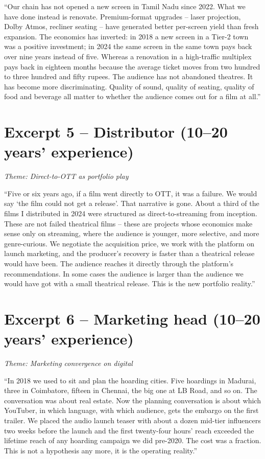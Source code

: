 ``Our chain has not opened a new screen in Tamil Nadu since 2022.
What we have done instead is renovate.  Premium-format upgrades --
laser projection, Dolby Atmos, recliner seating -- have generated
better per-screen yield than fresh expansion.  The economics has
inverted: in 2018 a new screen in a Tier-2 town was a positive
investment; in 2024 the same screen in the same town pays back over
nine years instead of five.  Whereas a renovation in a high-traffic
multiplex pays back in eighteen months because the average ticket
moves from two hundred to three hundred and fifty rupees.  The
audience has not abandoned theatres.  It has become more
discriminating.  Quality of sound, quality of seating, quality of
food and beverage all matter to whether the audience comes out for
a film at all.''

\section*{Excerpt 5 -- Distributor (10--20 years' experience)}
\textit{Theme: Direct-to-OTT as portfolio play}
\medskip

``Five or six years ago, if a film went directly to OTT, it was a
failure.  We would say `the film could not get a release'.  That
narrative is gone.  About a third of the films I distributed in
2024 were structured as direct-to-streaming from inception.  These
are not failed theatrical films -- these are projects whose
economics make sense only on streaming, where the audience is
younger, more selective, and more genre-curious.  We negotiate the
acquisition price, we work with the platform on launch marketing,
and the producer's recovery is faster than a theatrical release
would have been.  The audience reaches it directly through the
platform's recommendations.  In some cases the audience is larger
than the audience we would have got with a small theatrical
release.  This is the new portfolio reality.''

\section*{Excerpt 6 -- Marketing head (10--20 years' experience)}
\textit{Theme: Marketing convergence on digital}
\medskip

``In 2018 we used to sit and plan the hoarding cities.  Five
hoardings in Madurai, three in Coimbatore, fifteen in Chennai, the
big one at LB Road, and so on.  The conversation was about real
estate.  Now the planning conversation is about which YouTuber, in
which language, with which audience, gets the embargo on the first
trailer.  We placed the audio launch teaser with about a dozen
mid-tier influencers two weeks before the launch and the first
twenty-four hours' reach exceeded the lifetime reach of any
hoarding campaign we did pre-2020.  The cost was a fraction.  This
is not a hypothesis any more, it is the operating reality.''

